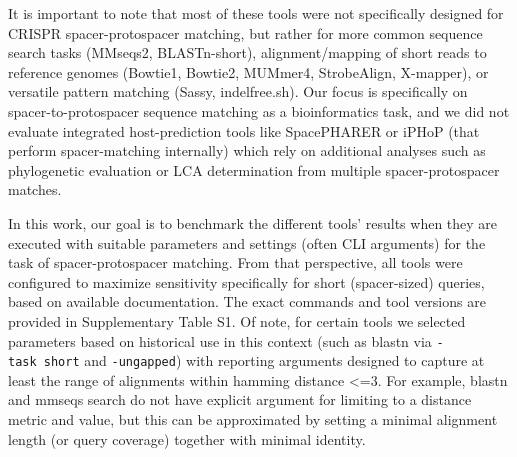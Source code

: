 \documentclass[
]{article}
\begin{document}
It is important to note that most of these tools were not specifically
designed for CRISPR spacer-protospacer matching, but rather for more
common sequence search tasks (MMseqs2, BLASTn-short), alignment/mapping
of short reads to reference genomes (Bowtie1, Bowtie2, MUMmer4,
StrobeAlign, X-mapper), or versatile pattern matching (Sassy,
indelfree.sh). Our focus is specifically on spacer-to-protospacer
sequence matching as a bioinformatics task, and we did not evaluate
integrated host-prediction tools like SpacePHARER\autocite{Zhang_2021}
or iPHoP\autocite{Roux2023_iphop} (that perform spacer-matching
internally) which rely on additional analyses such as phylogenetic
evaluation or LCA determination from multiple spacer-protospacer
matches.

In this work, our goal is to benchmark the different tools' results when
they are executed with suitable parameters and settings (often CLI
arguments) for the task of spacer-protospacer matching. From that
perspective, all tools were configured to maximize sensitivity
specifically for short (spacer-sized) queries, based on available
documentation. The exact commands and tool versions are provided in
Supplementary Table S1. Of note, for certain tools we selected
parameters based on historical use in this context (such as blastn via
\texttt{-task\ short} and \texttt{-ungapped}) with reporting arguments
designed to capture at least the range of alignments within hamming
distance \textless=3. For example, blastn and mmseqs search do not have
explicit argument for limiting to a distance metric and value, but this
can be approximated by setting a minimal alignment length (or query
coverage) together with minimal identity.
\end{document}
